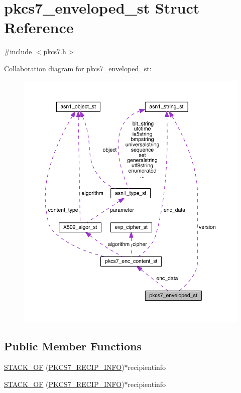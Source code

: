 \hypertarget{structpkcs7__enveloped__st}{}\section{pkcs7\+\_\+enveloped\+\_\+st Struct Reference}
\label{structpkcs7__enveloped__st}


{\ttfamily \#include $<$pkcs7.\+h$>$}



Collaboration diagram for pkcs7\+\_\+enveloped\+\_\+st\+:\nopagebreak
\begin{figure}[H]
\begin{center}
\leavevmode
\includegraphics[width=350pt]{structpkcs7__enveloped__st__coll__graph}
\end{center}
\end{figure}
\subsection*{Public Member Functions}
\begin{DoxyCompactItemize}
\item 
\hyperlink{structpkcs7__enveloped__st_ac8135debb745184beb113b43ab7fd215}{S\+T\+A\+C\+K\+\_\+\+OF} (\hyperlink{crypto_2pkcs7_2pkcs7_8h_a8b0ed73366ea46f65dfaa11ae7882dad}{P\+K\+C\+S7\+\_\+\+R\+E\+C\+I\+P\+\_\+\+I\+N\+FO})$\ast$recipientinfo
\item 
\hyperlink{structpkcs7__enveloped__st_ac8135debb745184beb113b43ab7fd215}{S\+T\+A\+C\+K\+\_\+\+OF} (\hyperlink{crypto_2pkcs7_2pkcs7_8h_a8b0ed73366ea46f65dfaa11ae7882dad}{P\+K\+C\+S7\+\_\+\+R\+E\+C\+I\+P\+\_\+\+I\+N\+FO})$\ast$recipientinfo
\end{DoxyCompactItemize}
